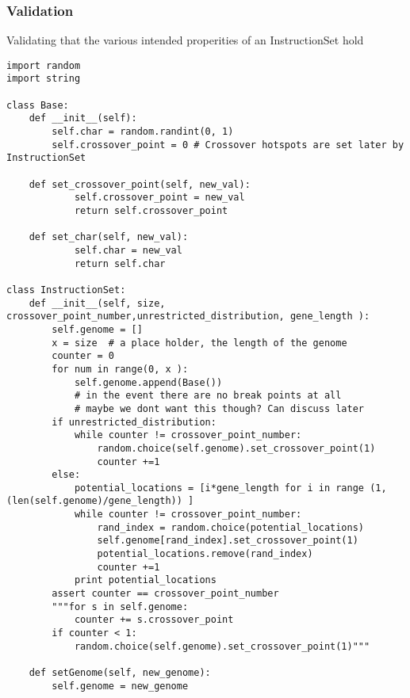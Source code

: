 \documentclass[a4paper]{article}
\begin{document}
\subsubsection{Validation}
\label{sec-6-3-1}
Validating that the various intended properities of an InstructionSet hold
\begin{verbatim}
import random
import string

class Base:
    def __init__(self):
        self.char = random.randint(0, 1)
        self.crossover_point = 0 # Crossover hotspots are set later by InstructionSet

    def set_crossover_point(self, new_val):
            self.crossover_point = new_val
            return self.crossover_point

    def set_char(self, new_val):
            self.char = new_val
            return self.char

class InstructionSet:
    def __init__(self, size, crossover_point_number,unrestricted_distribution, gene_length ):
        self.genome = []
        x = size  # a place holder, the length of the genome
        counter = 0 
        for num in range(0, x ):
            self.genome.append(Base())
            # in the event there are no break points at all
            # maybe we dont want this though? Can discuss later
        if unrestricted_distribution:
            while counter != crossover_point_number:
                random.choice(self.genome).set_crossover_point(1)
                counter +=1 
        else:
            potential_locations = [i*gene_length for i in range (1, (len(self.genome)/gene_length)) ]
            while counter != crossover_point_number:
                rand_index = random.choice(potential_locations)
                self.genome[rand_index].set_crossover_point(1)
                potential_locations.remove(rand_index)
                counter +=1
            print potential_locations
        assert counter == crossover_point_number 
        """for s in self.genome:
            counter += s.crossover_point
        if counter < 1:
            random.choice(self.genome).set_crossover_point(1)"""

    def setGenome(self, new_genome):
        self.genome = new_genome



\end{verbatim}
\end{document}
